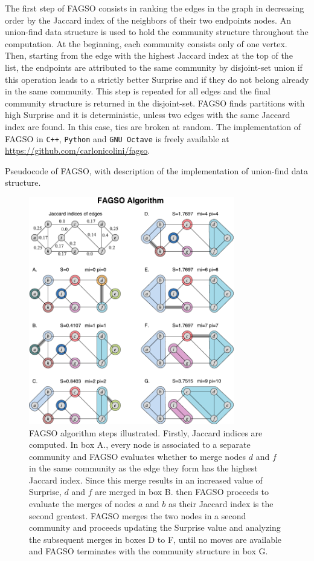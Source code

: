 The first step of FAGSO consists in ranking the edges in the graph in decreasing order by the Jaccard index of the neighbors of their two endpoints nodes.
An union-find data structure is used to hold the community structure throughout the computation.
At the beginning, each community consists only of one vertex.
Then, starting from the edge with the highest Jaccard index at the top of the list, the endpoints are attributed to the same community by disjoint-set union if this operation leads to a strictly better Surprise and if they do not belong already in the same community.
This step is repeated for all edges and the final community structure is returned in the disjoint-set.
FAGSO finds partitions with high Surprise and it is deterministic, unless two edges with the same Jaccard index are found. In this case, ties are broken at random. 
The implementation of FAGSO in \texttt{C++}, \texttt{Python} and \texttt{GNU Octave} is freely available at \url{https://github.com/carlonicolini/fagso}.
\begin{Algorithm}[htb!]

\caption{Pseudocode of FAGSO, with description of the implementation of union-find data structure.}
\label{alg:fagso}
\end{Algorithm}
\begin{figure}[htb!]
\centering
\includegraphics[width=0.8\textwidth]{images/fagso.pdf}
\caption{FAGSO algorithm steps illustrated. Firstly, Jaccard indices are computed. In box A., every node is associated to a separate community and FAGSO evaluates whether to merge nodes $d$ and $f$ in the same community as the edge they form has the highest Jaccard index. Since this merge results in an increased value of Surprise, $d$ and $f$ are merged in box B. then FAGSO proceeds to evaluate the merges of nodes $a$ and $b$ as their Jaccard index is the second greatest. FAGSO merges the two nodes in a second community and proceeds updating the Surprise value and analyzing the subsequent merges in boxes D to F, until no moves are available and FAGSO terminates with the community structure in box G.}
\label{fig:fagso_working}
\end{figure}

